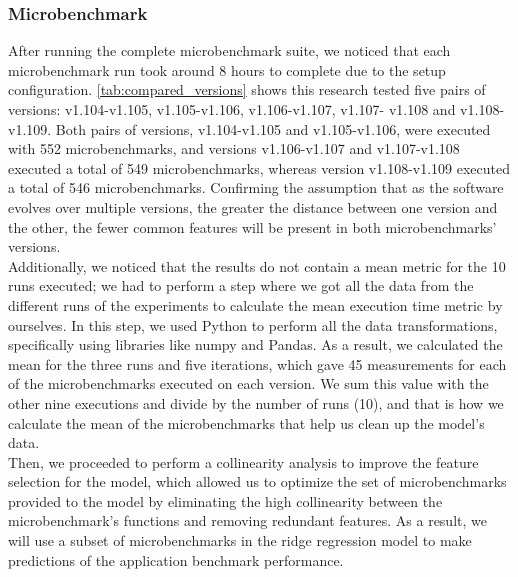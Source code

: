 \subsubsection{Microbenchmark}
After running the complete microbenchmark suite, we noticed that each microbenchmark run took around 8 hours to complete due to the setup configuration. \cref{tab:compared_versions} shows this research tested five pairs of versions: v1.104-v1.105, v1.105-v1.106, v1.106-v1.107, v1.107- v1.108 and v1.108-v1.109. Both pairs of versions, v1.104-v1.105 and v1.105-v1.106, were executed with 552 microbenchmarks, and versions v1.106-v1.107 and v1.107-v1.108 executed a total of 549 microbenchmarks, whereas version v1.108-v1.109 executed a total of 546 microbenchmarks. Confirming the assumption that as the software evolves over multiple versions, the greater the distance between one version and the other, the fewer common features will be present in both microbenchmarks’ versions. \\
Additionally, we noticed that the results do not contain a mean metric for the 10 runs executed; we had to perform a step where we got all the data from the different runs of the experiments to calculate the mean execution time metric by ourselves. In this step, we used Python to perform all the data transformations, specifically using libraries like numpy and Pandas. As a result, we calculated the mean for the three runs and five iterations, which gave 45 measurements for each of the microbenchmarks executed on each version. We sum this value with the other nine executions and divide by the number of runs (10), and that is how we calculate the mean of the microbenchmarks that help us clean up the model's data.  \\
Then, we proceeded to perform a collinearity analysis to improve the feature selection for the model, which allowed us to optimize the set of microbenchmarks provided to the model by eliminating the high collinearity between the microbenchmark's functions and removing redundant features. As a result, we will use a subset of microbenchmarks in the ridge regression model to make predictions of the application benchmark performance. \\
